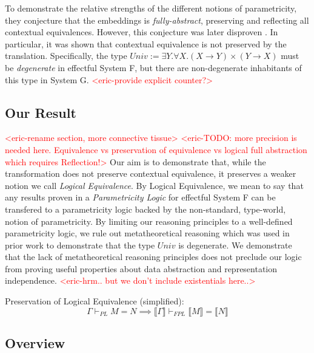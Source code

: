 \documentclass[acmsmall]{acmart}
\newcommand{\den}[1]{\llbracket #1\rrbracket}
\newcommand{\eric}[1]{\textcolor{red}{ <eric-#1> }}
\begin{document}
To demonstrate the relative strengths of the different notions of parametricity, they conjecture that the embeddings is \textit{fully-abstract}, preserving and reflecting all contextual equivalences. However, this conjecture was later disproven\cite{ParamVSUniv} \cite{TwoParamVSThreeUniv}. In particular, it was shown that contextual equivalence is not preserved by the translation. Specifically, the type $Univ := \exists Y.\forall X. (X\rightarrow Y)\times (Y \rightarrow X)$ must be \textit{degenerate} in effectful System F, but there are non-degenerate inhabitants of this type in System G. \eric{provide explicit counter?}

\subsection{Our Result}
\eric{rename section, more connective tissue}
\eric{TODO: more precision is needed here. Equivalence vs preservation of equivalence vs logical full abstraction which requires Reflection!}
Our aim is to demonstrate that, while the transformation does not preserve contextual equivalence, it preserves a weaker notion we call \textit{Logical Equivalence}. By Logical Equivalence, we mean to say that any results proven in a \textit{Parametricity Logic}\cite{APL}\cite{LAPL}\cite{PE} for effectful System F can be transfered to a parametricity logic backed by the non-standard, type-world, notion of parametricity. By limiting our reasoning principles to a well-defined parametricity logic, we rule out metatheoretical reasoning which was used in prior work\cite{TwoParamVSThreeUniv} to demonstrate that the type $Univ$ is degenerate. We demonstrate that the lack of metatheoretical reasoning principles does not preclude our logic from proving useful properties about data abstraction and representation independence. \eric{hrm.. but we don't include existentials here..}

\begin{theorem}
  Preservation of Logical Equivalence (simplified):
  $$\Gamma \vdash_{PL} M = N \implies \den{\Gamma} \vdash_{FPL} \den{M} = \den{N}$$
\end{theorem}



\subsection{Overview}
\end{document}
